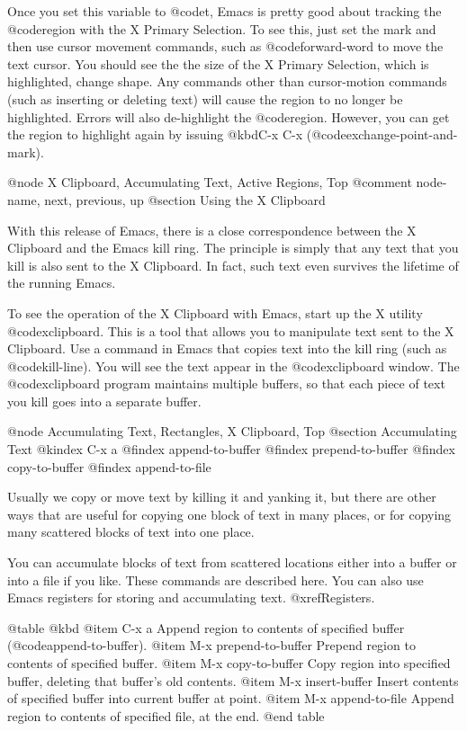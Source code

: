 {{{{{{{{Once you set this variable to @code{t}, Emacs is pretty good about
tracking the @code{region} with the X Primary Selection.  To see this,
just set the mark and then use cursor movement commands, such as
@code{forward-word} to move the text cursor. You should see the the size
of the X Primary Selection, which is highlighted, change shape. Any
commands other than cursor-motion commands (such as inserting or
deleting text) will cause the region to no longer be highlighted.
Errors will also de-highlight the @code{region}.
However, you can get the region to highlight again by issuing @kbd{C-x
C-x} (@code{exchange-point-and-mark)}.

@node X Clipboard, Accumulating Text, Active Regions, Top
@comment  node-name,  next,  previous,  up
@section Using the X Clipboard

With this release of Emacs, there is a close correspondence between the
X Clipboard and the Emacs kill ring. The principle is simply that
any text that you kill is also sent to the X Clipboard.  In fact, such
text even survives the lifetime of the running Emacs.

To see the operation of the X Clipboard with Emacs, start up the 
X utility @code{xclipboard}.
This is a tool that allows you to manipulate
text sent to the X Clipboard. Use a command in Emacs that 
copies text into the kill ring (such as @code{kill-line}).
You will see the text appear
in the @code{xclipboard} window. The @code{xclipboard} program maintains
multiple buffers, so that each piece of text you kill goes into a
separate buffer.

@node Accumulating Text, Rectangles, X Clipboard, Top
@section Accumulating Text
@kindex C-x a
@findex append-to-buffer
@findex prepend-to-buffer
@findex copy-to-buffer
@findex append-to-file

  Usually we copy or move text by killing it and yanking it, but there are
other ways that are useful for copying one block of text in many places, or
for copying many scattered blocks of text into one place.

  You can accumulate blocks of text from scattered locations either into a
buffer or into a file if you like.  These commands are described here.  You
can also use Emacs registers for storing and accumulating text.
@xref{Registers}.

@table @kbd
@item C-x a
Append region to contents of specified buffer (@code{append-to-buffer}).
@item M-x prepend-to-buffer
Prepend region to contents of specified buffer.
@item M-x copy-to-buffer
Copy region into specified buffer, deleting that buffer's old contents.
@item M-x insert-buffer
Insert contents of specified buffer into current buffer at point.
@item M-x append-to-file
Append region to contents of specified file, at the end.
@end table

}}}}}}}}
